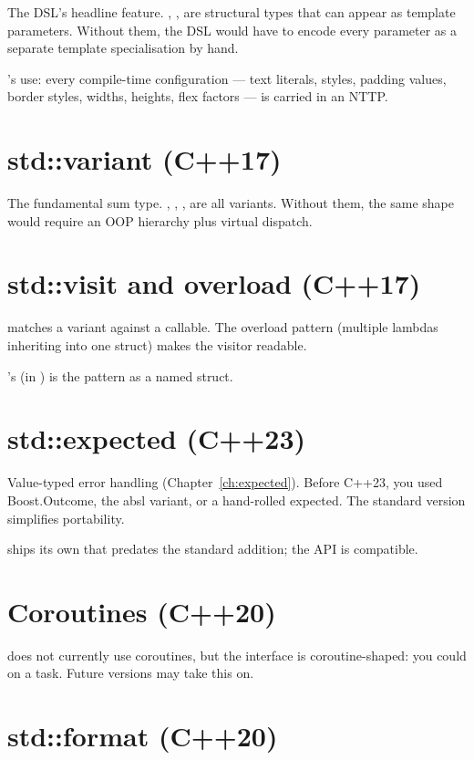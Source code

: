 The DSL's headline feature. , ,
 are structural types that can appear as template
parameters. Without them, the DSL would have to encode every
parameter as a separate template specialisation by hand.

\maya{}'s use: every compile-time configuration --- text
literals, styles, padding values, border styles, widths, heights,
flex factors --- is carried in an NTTP.

\section{std::variant (C++17)}

The fundamental sum type. , ,
,  are all variants. Without them,
the same shape would require an OOP hierarchy plus virtual
dispatch.

\section{std::visit and overload (C++17)}

 matches a variant against a callable. The
overload pattern (multiple lambdas inheriting into one struct)
makes the visitor readable.

\maya{}'s  (in
) is the pattern as a
named struct.

\section{std::expected (C++23)}

Value-typed error handling (Chapter~\ref{ch:expected}). Before
C++23, you used Boost.Outcome, the absl variant, or a hand-rolled
expected. The standard version simplifies portability.

\maya{} ships its own  that predates the standard
addition; the API is compatible.

\section{Coroutines (C++20)}

\maya{} does not currently use coroutines, but the
 interface is coroutine-shaped: you could
 on a task. Future versions may take this on.

\section{std::format (C++20)}

